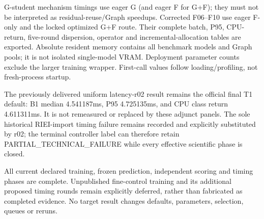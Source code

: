 G-student mechanism timings use eager G (and eager F for G+F); they must not be interpreted as residual-reuse/Graph speedups. Corrected F06--F10 use eager F-only and the locked optimized G+F route. Their complete batch, P95, CPU-return, five-round dispersion, operator and incremental-allocation tables are exported. Absolute resident memory contains all benchmark models and Graph pools; it is not isolated single-model VRAM. Deployment parameter counts exclude the larger training wrapper. First-call values follow loading/profiling, not fresh-process startup.

The previously delivered uniform latency-r02 result remains the official final T1 default: B1 median 4.541187ms, P95 4.725135ms, and CPU class return 4.611311ms. It is not remeasured or replaced by these adjunct panels. The sole historical RIEI-import timing failure remains recorded and explicitly substituted by r02; the terminal controller label can therefore retain PARTIAL\_TECHNICAL\_FAILURE while every effective scientific phase is closed.

All current declared training, frozen prediction, independent scoring and timing phases are complete. Unpublished fine-control training and its additional proposed timing rounds remain explicitly deferred, rather than fabricated as completed evidence. No target result changes defaults, parameters, selection, queues or reruns.
